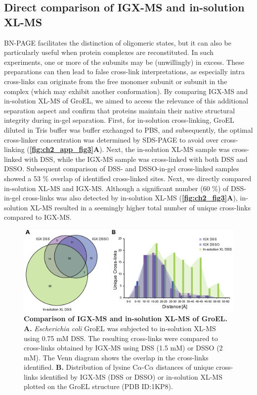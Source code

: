 \subsection*{Direct comparison of IGX-MS and in-solution XL-MS}
BN-PAGE facilitates the distinction of oligomeric states, but it can also be particularly useful when protein complexes are reconstituted. In such experiments, one or more of the subunits may be (unwillingly) in excess. These preparations can then lead to false cross-link interpretations, as especially intra cross-links can originate from the free monomer subunit or subunit in the complex (which may exhibit another conformation). By comparing IGX-MS and in-solution XL-MS of GroEL, we aimed to access the relevance of this additional separation aspect and confirm that proteins maintain their native structural integrity during in-gel separation. First, for in-solution cross-linking, GroEL diluted in Tris buffer was buffer exchanged to PBS, and subsequently, the optimal cross-linker concentration was determined by SDS-PAGE to avoid over cross-linking (\textbf{\autoref{fig:ch2_app_fig3}A}). Next, the in-solution XL-MS sample was cross-linked with DSS, while the IGX-MS sample was cross-linked with both DSS and DSSO. Subsequent comparison of DSS- and DSSO-in-gel cross-linked samples showed a 53 \% overlap of identified cross-linked sites. Next, we directly compared in-solution XL-MS and IGX-MS. Although a significant number (60 \%) of DSS-in-gel cross-links was also detected by in-solution XL-MS (\textbf{\autoref{fig:ch2_fig3}A}), in-solution XL-MS resulted in a seemingly higher total number of unique cross-links compared to IGX-MS.
\begin{figure}[hb]
    \center
    \includegraphics[]{Chapter.2/Figures/Figure3.png}
    \caption{\textbf{Comparison of IGX-MS and in-solution XL-MS of GroEL.} \textbf{A.} \emph{Escherichia coli} GroEL was subjected to in-solution XL-MS using 0.75 mM DSS. The resulting cross-links were compared to cross-links obtained by IGX-MS using DSS (1.5 mM) or DSSO (2 mM). The Venn diagram shows the overlap in the cross-links identified. \textbf{B.} Distribution of lysine C$\alpha$-C$\alpha$ distances of unique cross-links identified by IGX-MS (DSS or DSSO) or in-solution XL-MS plotted on the GroEL structure (PDB ID:1KP8).}
    \label{fig:ch2_fig3}
\end{figure}\clearpage
